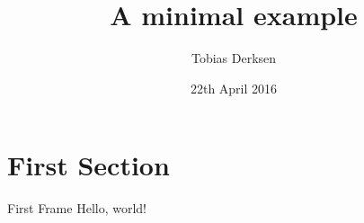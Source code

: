 \documentclass{beamer}
\title{A minimal example}
\date{22th April 2016}
\author{Tobias Derksen}
\institute{Fontys School of Technology \& Logistics}
\begin{document}
  \maketitle
  \section{First Section}
  \begin{frame}{First Frame}
    Hello, world!
  \end{frame}
\end{document}
